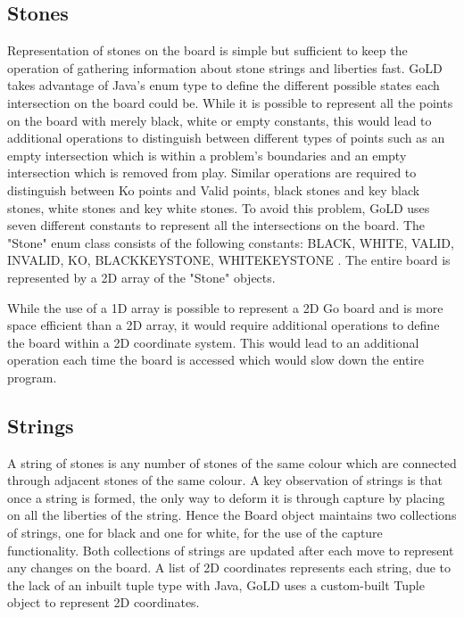 \documentclass{l4proj}
\begin{document}
\subsection{Stones}
Representation of stones on the board is simple but sufficient to keep the operation of gathering information about stone strings and liberties fast. GoLD takes advantage of Java’s enum type to define the different possible states each intersection on the board could be. While it is possible to represent all the points on the board with merely black, white or empty constants, this would lead to additional operations to distinguish between different types of points such as an empty intersection which is within a problem’s boundaries and an empty intersection which is removed from play. Similar operations are required to distinguish between Ko points and Valid points, black stones and key black stones, white stones and key white stones. To avoid this problem, GoLD uses seven different constants to represent all the intersections on the board. The "Stone" enum class consists of the following constants: BLACK, WHITE, VALID, INVALID, KO, BLACKKEYSTONE, WHITEKEYSTONE . The entire board is represented by a 2D array of the "Stone" objects.

While the use of a 1D array is possible to represent a 2D Go board and is more space efficient than a 2D array, it would require additional operations to define the board within a 2D coordinate system. This would lead to an additional operation each time the board is accessed which would slow down the entire program.

\subsection{Strings}
A string of stones is any number of stones of the same colour which are connected through adjacent stones of the same colour. A key observation of strings is that once a string is formed, the only way to deform it is through capture by placing on all the liberties of the string. Hence the Board object maintains two collections of strings, one for black and one for white, for the use of the capture functionality. Both collections of strings are updated after each move to represent any changes on the board. A list of 2D coordinates represents each string, due to the lack of an inbuilt tuple type with Java, GoLD uses a custom-built Tuple object to represent 2D coordinates.
\end{document}
